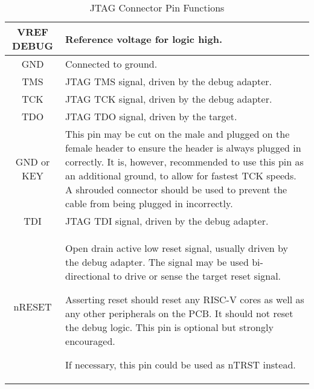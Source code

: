 \begin{table}[htp]
    \centering
    \caption{JTAG Connector Pin Functions}
    \label{tab:pinout}
    \begin{tabulary}{\textwidth}{|c|L|}
      \hline
      VREF DEBUG & Reference voltage for logic high. \\
      \hline
      GND & Connected to ground. \\
      \hline
      TMS & JTAG TMS signal, driven by the debug adapter. \\
      \hline
      TCK & JTAG TCK signal, driven by the debug adapter. \\
      \hline
      TDO & JTAG TDO signal, driven by the target. \\
      \hline
      GND or KEY &
        This pin may be cut on the male and plugged on the female header to
        ensure the header is always plugged in correctly. It is, however,
        recommended to use this pin as an additional ground, to allow for
        fastest TCK speeds. A shrouded connector should be used to prevent the
        cable from being plugged in incorrectly. \\
      \hline
      TDI & JTAG TDI signal, driven by the debug adapter. \\
      \hline
      nRESET & Open drain active low reset signal, usually driven by the debug
        adapter.  The signal may be used bi-directional to drive or sense the
        target reset signal.

        Asserting reset should reset any RISC-V cores as well as any other
        peripherals on the PCB. It should not reset the debug logic.  This pin
        is optional but strongly encouraged.

        If necessary, this pin could be used as nTRST instead.


\end{tabulary}
\end{table}

